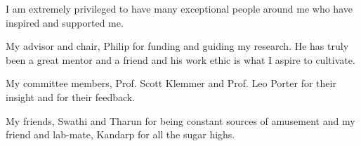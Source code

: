 
\begin{acknowledgements}
I am extremely privileged to have many exceptional people around me who have inspired and supported me.

My advisor and chair, Philip for funding and guiding my research. He has truly been a great mentor and a friend and his work ethic is what I aspire to cultivate.

My committee members, Prof. Scott Klemmer and Prof. Leo Porter for their insight and for their feedback.

My friends, Swathi and Tharun for being constant sources of amusement and my friend and lab-mate, Kandarp for all the sugar highs.
\end{acknowledgements}